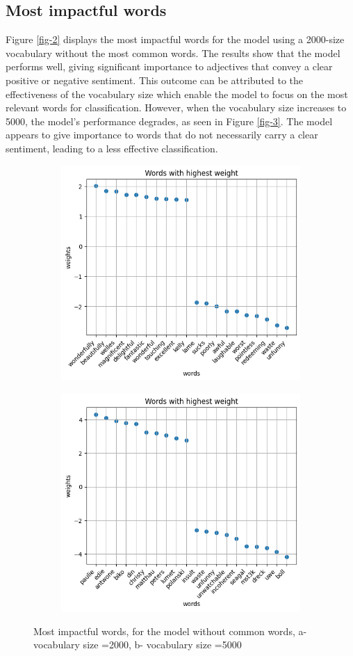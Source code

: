 \documentclass[eng]{class}
\begin{document}
\subsection{Most impactful words}
Figure \ref{fig-2} displays the most impactful words for the model using a 2000-size vocabulary without the most common words.
The results show that the model performs well, giving significant importance to adjectives that convey a clear positive or negative sentiment.
This outcome can be attributed to the effectiveness of the vocabulary size which enable the model to focus on the most relevant words for classification.
However, when the vocabulary size increases to 5000, the model's performance degrades, as seen in Figure \ref{fig-3}.
The model appears to give importance to words that do not necessarily carry a clear sentiment, leading to a less effective classification.


\begin{figure}
  \centering
  \begin{subfigure}{.5\columnwidth}
    \centering
    \includegraphics[width=.6\columnwidth]{images/words.png}
    \caption{}
    \label{fig:sub1}
  \end{subfigure}%
  \begin{subfigure}{.5\columnwidth}
    \centering
    \includegraphics[width=.6\columnwidth]{images/words5000.png}
    \caption{}
    \label{fig:sub2}
  \end{subfigure}
  \caption{Most impactful words, for the model without common words, a- vocabulary size =2000, b- vocabulary size =5000}
  \label{fig:test}
\end{figure}
\end{document}
